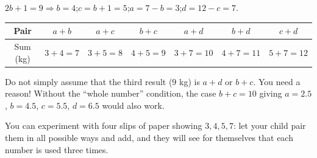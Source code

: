{
$2b+1=9\Rightarrow b=4$;\quad $c=b+1=5$;\quad $a=7-b=3$;\quad $d=12-c=7$.
\begin{center}
\begin{tabular}{|c|c|c|c|c|c|c|}
\hline
\rowcolor{tmBlue!10} Pair & $a+b$ & $a+c$ & $b+c$ & $a+d$ & $b+d$ & $c+d$\\ \hline
Sum (kg) & $3+4=7$ & $3+5=8$ & $4+5=9$ & $3+7=10$ & $4+7=11$ & $5+7=12$\\ \hline
\end{tabular}
\end{center}
\begin{warnbox}Do not simply assume that the third result ($9$ kg) is $a+d$ or $b+c$. You need a reason! Without the ``whole number'' condition, the case $b+c=10$ giving $a=2.5$, $b=4.5$, $c=5.5$, $d=6.5$ would also work.\end{warnbox}
\begin{parentbox}You can experiment with four slips of paper showing $3,4,5,7$: let your child pair them in all possible ways and add, and they will see for themselves that each number is used three times.\end{parentbox}
}
